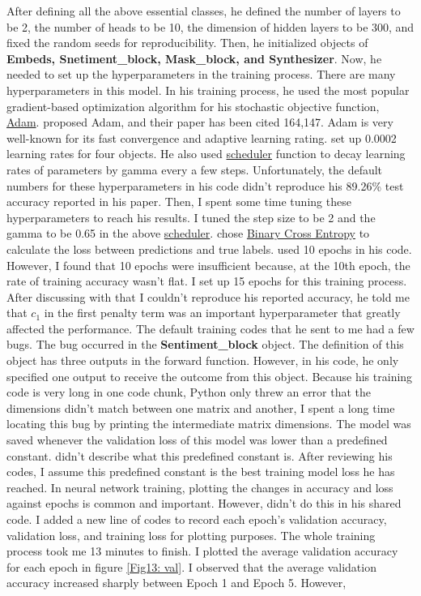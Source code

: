 \documentclass[aoas]{imsart}
\numberwithin{equation}{section}
\theoremstyle{plain}
\theoremstyle{remark}
\begin{document}
After defining all the above essential classes, he defined the number of layers to be 2, the number of heads to be 10, the dimension of hidden layers to be 300, and fixed the random seeds for reproducibility. Then, he initialized objects of \textbf{Embeds, Snetiment\_block, Mask\_block, and Synthesizer}. Now, he needed to set up the hyperparameters in the training process. There are many hyperparameters in this model. In his training process, he used the most popular gradient-based optimization algorithm for his stochastic objective function, \href{https://pytorch.org/docs/stable/generated/torch.optim.Adam.html}{Adam}. \cite{kingma2014adam} proposed Adam, and their paper has been cited 164,147. Adam is very well-known for its fast convergence and adaptive learning rating. \cite{chenyu} set up 0.0002 learning rates for four objects. He also used \href{https://pytorch.org/docs/stable/generated/torch.optim.lr_scheduler.StepLR.html}{scheduler} function to decay learning rates of parameters by gamma every a few steps. Unfortunately, the default numbers for these hyperparameters in his code didn't reproduce his 89.26\% test accuracy reported in his paper. Then, I spent some time tuning these hyperparameters to reach his results. I tuned the step size to be 2 and the gamma to be 0.65 in the above \href{https://pytorch.org/docs/stable/generated/torch.optim.lr_scheduler.StepLR.html}{scheduler}. \cite{chenyu} chose \href{https://pytorch.org/docs/stable/generated/torch.nn.BCELoss.html}{Binary Cross Entropy} to calculate the loss between predictions and true labels. \cite{chenyu} used 10 epochs in his code. However, I found that 10 epochs were insufficient because, at the 10th epoch, the rate of training accuracy wasn't flat. I set up 15 epochs for this training process. After discussing with \cite{chenyu} that I couldn't reproduce his reported accuracy, he told me that $c_1$ in the first penalty term was an important hyperparameter that greatly affected the performance. The default training codes that he sent to me had a few bugs. The bug occurred in the \textbf{Sentiment\_block} object. The definition of this object has three outputs in the forward function. However, in his code, he only specified one output to receive the outcome from this object. Because his training code is very long in one code chunk, Python only threw an error that the dimensions didn't match between one matrix and another, I spent a long time locating this bug by printing the intermediate matrix dimensions. The model was saved whenever the validation loss of this model was lower than a predefined constant. \cite{chenyu} didn't describe what this predefined constant is. After reviewing his codes, I assume this predefined constant is the best training model loss he has reached. In neural network training, plotting the changes in accuracy and loss against epochs is common and important. However, \cite{chenyu} didn't do this in his shared code. I added a new line of codes to record each epoch's validation accuracy, validation loss, and training loss for plotting purposes. The whole training process took me 13 minutes to finish. I plotted the average validation accuracy for each epoch in figure \ref{Fig13: val}. I observed that the average validation accuracy increased sharply between Epoch 1 and Epoch 5. However, 
\end{document}
